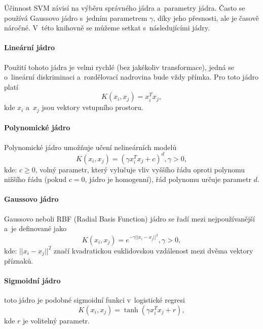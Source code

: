Účinnost SVM závisí na výběru správného jádra a~parametry jádra. Často se používá Gaussovo jádro s~jedním parametrem $\gamma$, díky jeho přesnosti, ale je časově náročné. V~této knihovně se můžeme setkat s~následujícími jádry.

\paragraph*{Lineární jádro} 
Použití tohoto jádra je velmi rychlé (bez jakékoliv transformace), jedná se o~lineární diskriminaci a~rozdělovací nadrovina bude vždy přímka. Pro toto jádro platí 
\begin{equation*}
 \label{linearK}
  K(x_i, x_j) = x_i^T x_j,
\end{equation*}
  kde $x_i$ a~$x_j$ jsou vektory vstupního prostoru.

\paragraph*{Polynomické jádro} 
Polynomické jádro umožňuje učení nelineárních modelů
\begin{equation*}
\label{polyK}
  K(x_i, x_j) = (\gamma x_i^T x_j + c)^{d}, \gamma > 0,
\end{equation*}
kde: $c \geq 0$, volný parametr, který vylučuje vliv vyššího řádu oproti polynomu nižšího řádu (pokud $c = 0$, jádro je homogenní), řád polynomu určuje parametr $d$.

\paragraph*{Gaussovo jádro} 
Gaussovo neboli RBF (Radial Basis Function) jádro se řadí mezi nejpoužívanější a~je definované jako
\begin{equation*}
\label{RBFK}
 K(x_i, x_j) = e^{-\gamma ||x_i - x_j||^2}, \gamma > 0,
\end{equation*}
kde: $||x_i - x_j||^2$ značí kvadratickou euklidovskou vzdálenost mezi dvěma vektory příznaků.

\paragraph*{Sigmoidní jádro} 
toto jádro je podobné sigmoidní funkci v~logistické regresi
\begin{equation*}
\label{sigmK}
 K(x_i, x_j) = \tanh(\gamma x_i^T x_j + r),
\end{equation*}
kde $r$ je volitelný parametr.

